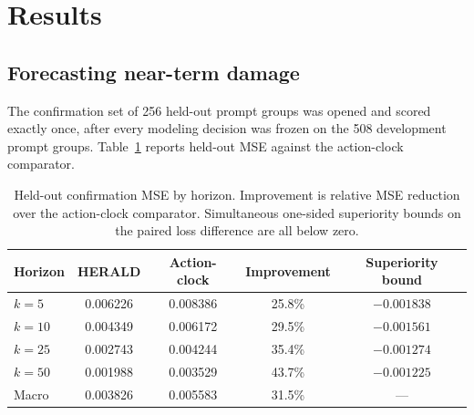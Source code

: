 \section{Results}

\label{sec:results}

\subsection{Forecasting near-term damage}

The confirmation set of 256 held-out prompt groups was opened and scored
exactly once, after every modeling decision was frozen on the 508 development
prompt groups. Table~\ref{tab:main-results} reports held-out MSE against the
action-clock comparator.

\begin{table}[t]
\centering
\caption{Held-out confirmation MSE by horizon. Improvement is relative MSE
reduction over the action-clock comparator. Simultaneous one-sided
superiority bounds on the paired loss difference are all below zero.}
\label{tab:main-results}
\begin{tabular}{lcccc}
\toprule
Horizon & HERALD & Action-clock & Improvement & Superiority bound \\
\midrule
$k{=}5$  & 0.006226 & 0.008386 & 25.8\% & $-0.001838$ \\
$k{=}10$ & 0.004349 & 0.006172 & 29.5\% & $-0.001561$ \\
$k{=}25$ & 0.002743 & 0.004244 & 35.4\% & $-0.001274$ \\
$k{=}50$ & 0.001988 & 0.003529 & 43.7\% & $-0.001225$ \\
\midrule
Macro    & 0.003826 & 0.005583 & 31.5\% & --- \\
\bottomrule
\end{tabular}
\end{table}

